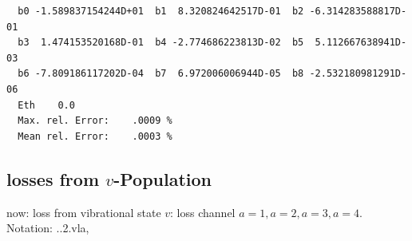 \documentclass[12pt,dvipdfmx]{article}
\begin{document}
\begin{small}\begin{verbatim}
  b0 -1.589837154244D+01  b1  8.320824642517D-01  b2 -6.314283588817D-01
  b3  1.474153520168D-01  b4 -2.774686223813D-02  b5  5.112667638941D-03
  b6 -7.809186117202D-04  b7  6.972006006944D-05  b8 -2.532180981291D-06
  Eth    0.0
  Max. rel. Error:    .0009 %
  Mean rel. Error:    .0003 %

\end{verbatim}\end{small}

\newpage
\subsection{
losses from $v$-Population
}\label{secloss}
now: loss from vibrational state $v$: loss channel $a=1, a=2, a=3, a=4$. Notation: ..2.vla,
\end{document}
